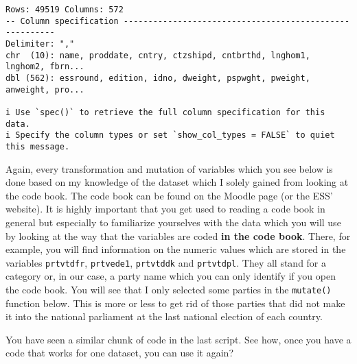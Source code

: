 \documentclass[
  letterpaper,
  DIV=11,
  numbers=noendperiod]{scrreprt}
\begin{document}
\begin{verbatim}
Rows: 49519 Columns: 572
-- Column specification --------------------------------------------------------
Delimiter: ","
chr  (10): name, proddate, cntry, ctzshipd, cntbrthd, lnghom1, lnghom2, fbrn...
dbl (562): essround, edition, idno, dweight, pspwght, pweight, anweight, pro...

i Use `spec()` to retrieve the full column specification for this data.
i Specify the column types or set `show_col_types = FALSE` to quiet this message.
\end{verbatim}

Again, every transformation and mutation of variables which you see
below is done based on my knowledge of the dataset which I solely gained
from looking at the code book. The code book can be found on the Moodle
page (or the ESS' website). It is highly important that you get used to
reading a code book in general but especially to familiarize yourselves
with the data which you will use by looking at the way that the
variables are coded \textbf{in the code book}. There, for example, you
will find information on the numeric values which are stored in the
variables \texttt{prtvtdfr}, \texttt{prtvede1}, \texttt{prtvtddk} and
\texttt{prtvtdpl}. They all stand for a category or, in our case, a
party name which you can only identify if you open the code book. You
will see that I only selected some parties in the \texttt{mutate()}
function below. This is more or less to get rid of those parties that
did not make it into the national parliament at the last national
election of each country.

You have seen a similar chunk of code in the last script. See how, once
you have a code that works for one dataset, you can use it again?
\end{document}
